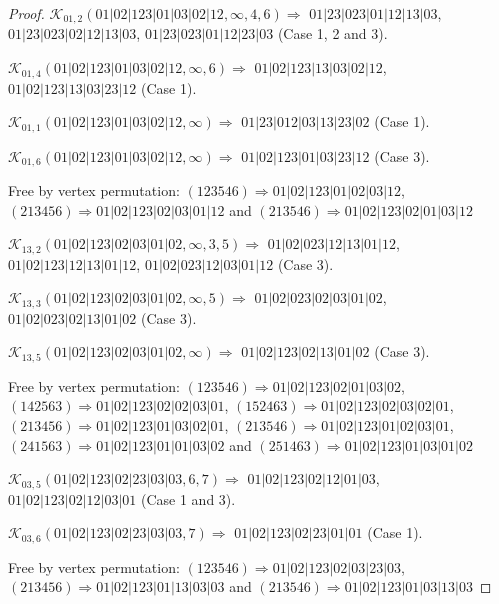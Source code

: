 \documentclass[12pt]{article}
\theoremstyle{plain}
\theoremstyle{definition}
\theoremstyle{remark}
\newcommand{\fancy}[1]{\mathcal{#1}}
\def\K{\fancy{K}}
\begin{document}
\begin{proof}
	
	
	\bigskip
	
	$\K_{01,2}(01|02|123|01|03|02|12,\infty,4, 6)\Rightarrow $ $01|23|023|01|12|13|03$, $01|23|023|02|12|13|03$, $01|23|023|01|12|23|03$ (Case 1, 2 and 3).
	
	$\K_{01,4}(01|02|123|01|03|02|12,\infty,6)\Rightarrow $ $01|02|123|13|03|02|12$, $01|02|123|13|03|23|12$ (Case 1).
	
	$\K_{01,1}(01|02|123|01|03|02|12,\infty)\Rightarrow $ $01|23|012|03|13|23|02$ (Case 1).
	
	$\K_{01,6}(01|02|123|01|03|02|12,\infty)\Rightarrow $ $01|02|123|01|03|23|12$ (Case 3).
	
	
	
	Free by vertex permutation: $(1 2 3 5 4 6)\Rightarrow 01|02|123|01|02|03|12$, $(2 1 3 4 5 6)\Rightarrow 01|02|123|02|03|01|12$ and $(2 1 3 5 4 6)\Rightarrow 01|02|123|02|01|03|12$
	
	
	
	\bigskip
	
	$\K_{13,2}(01|02|123|02|03|01|02,\infty,3, 5)\Rightarrow $ $01|02|023|12|13|01|12$, $01|02|123|12|13|01|12$, $01|02|023|12|03|01|12$ (Case 3).
	
	$\K_{13,3}(01|02|123|02|03|01|02,\infty,5)\Rightarrow $ $01|02|023|02|03|01|02$, $01|02|023|02|13|01|02$ (Case 3).
	
	$\K_{13,5}(01|02|123|02|03|01|02,\infty)\Rightarrow $ $01|02|123|02|13|01|02$ (Case 3).
	
	
	
	Free by vertex permutation: $(1 2 3 5 4 6)\Rightarrow 01|02|123|02|01|03|02$, $(1 4 2 5 6 3)\Rightarrow 01|02|123|02|02|03|01$, $(1 5 2 4 6 3)\Rightarrow 01|02|123|02|03|02|01$, $(2 1 3 4 5 6)\Rightarrow 01|02|123|01|03|02|01$, $(2 1 3 5 4 6)\Rightarrow 01|02|123|01|02|03|01$, $(2 4 1 5 6 3)\Rightarrow 01|02|123|01|01|03|02$ and $(2 5 1 4 6 3)\Rightarrow 01|02|123|01|03|01|02$
	
	
	
	\bigskip
	
	$\K_{03,5}(01|02|123|02|23|03|03,6, 7)\Rightarrow $ $01|02|123|02|12|01|03$, $01|02|123|02|12|03|01$ (Case 1 and 3).
	
	$\K_{03,6}(01|02|123|02|23|03|03,7)\Rightarrow $ $01|02|123|02|23|01|01$ (Case 1).
	
	
	
	Free by vertex permutation: $(1 2 3 5 4 6)\Rightarrow 01|02|123|02|03|23|03$, $(2 1 3 4 5 6)\Rightarrow 01|02|123|01|13|03|03$ and $(2 1 3 5 4 6)\Rightarrow 01|02|123|01|03|13|03$
	

\end{proof}
\end{document}
